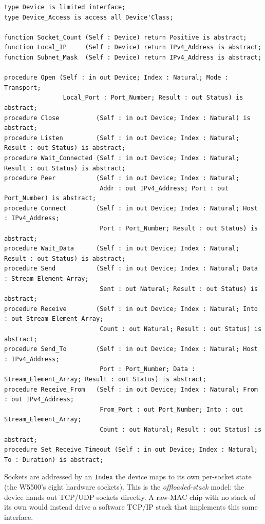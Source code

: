 \begin{lstlisting}
type Device is limited interface;
type Device_Access is access all Device'Class;

function Socket_Count (Self : Device) return Positive is abstract;
function Local_IP     (Self : Device) return IPv4_Address is abstract;
function Subnet_Mask  (Self : Device) return IPv4_Address is abstract;

procedure Open (Self : in out Device; Index : Natural; Mode : Transport;
                Local_Port : Port_Number; Result : out Status) is abstract;
procedure Close          (Self : in out Device; Index : Natural) is abstract;
procedure Listen         (Self : in out Device; Index : Natural; Result : out Status) is abstract;
procedure Wait_Connected (Self : in out Device; Index : Natural; Result : out Status) is abstract;
procedure Peer           (Self : in out Device; Index : Natural;
                          Addr : out IPv4_Address; Port : out Port_Number) is abstract;
procedure Connect        (Self : in out Device; Index : Natural; Host : IPv4_Address;
                          Port : Port_Number; Result : out Status) is abstract;
procedure Wait_Data      (Self : in out Device; Index : Natural; Result : out Status) is abstract;
procedure Send           (Self : in out Device; Index : Natural; Data : Stream_Element_Array;
                          Sent : out Natural; Result : out Status) is abstract;
procedure Receive        (Self : in out Device; Index : Natural; Into : out Stream_Element_Array;
                          Count : out Natural; Result : out Status) is abstract;
procedure Send_To        (Self : in out Device; Index : Natural; Host : IPv4_Address;
                          Port : Port_Number; Data : Stream_Element_Array; Result : out Status) is abstract;
procedure Receive_From   (Self : in out Device; Index : Natural; From : out IPv4_Address;
                          From_Port : out Port_Number; Into : out Stream_Element_Array;
                          Count : out Natural; Result : out Status) is abstract;
procedure Set_Receive_Timeout (Self : in out Device; Index : Natural; To : Duration) is abstract;
\end{lstlisting}

Sockets are addressed by an \texttt{Index} the device maps to its own per-socket
state (the W5500's eight hardware sockets). This is the \emph{offloaded-stack}
model: the device hands out TCP/UDP sockets directly. A raw-MAC chip with no stack
of its own would instead drive a software TCP/IP stack that implements this same
interface.

